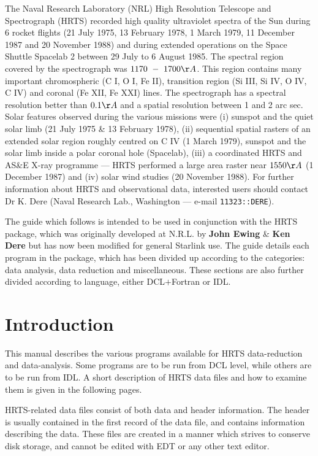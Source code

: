 The Naval Research Laboratory (NRL) High Resolution Telescope and Spectrograph
(HRTS) recorded high quality ultraviolet spectra of the Sun during 6 rocket 
flights (21 July 1975, 13 February 1978, 1 March 1979, 11 December 1987 
and 20 November 1988) and during extended operations on the Space 
Shuttle Spacelab 2 between 29 July to 6 August 1985. The spectral region 
covered by the spectrograph was $1170 \ - \ 1700\AA$. This region 
contains many important chromospheric (C I, O I, Fe II), transition 
region (Si III, Si IV, O IV, C IV) and coronal (Fe XII, Fe XXI) lines. 
The spectrograph has a spectral resolution better than $0.1\AA$ and a 
spatial resolution between 1 and 2 arc sec. Solar features observed 
during the various missions were (i) sunspot and the quiet solar limb 
(21 July 1975 \& 13 February 1978), (ii) sequential spatial rasters of 
an extended solar region roughly centred on C IV (1 March  1979), 
sunspot and the solar limb inside a polar coronal hole (Spacelab), (iii) 
a coordinated HRTS and AS\&E X-ray programme --- HRTS performed a large 
area raster near $1550\AA$ (1 December 1987) and (iv) solar wind studies 
(20 November 1988). For further information about HRTS and observational 
data, interested users should contact Dr K. Dere (Naval Research Lab., 
Washington --- e-mail {\tt 11323::DERE}).

 The guide which follows is intended to be used in conjunction with the 
 HRTS package, which was originally developed at N.R.L. by {\bf John Ewing}
 \& {\bf Ken Dere} but has now been modified for general Starlink use.
 The guide details each program
 in the package, which has been divided up according to the categories:
 data analysis, data reduction and miscellaneous. These sections are also
 further divided according to language, either DCL$+$Fortran or IDL.


\newpage

\section{Introduction}

This manual describes the various programs available for HRTS data-reduction
and data-anal\-ysis.  Some programs are to be run from DCL level, while others
are to be run from IDL. A short description of HRTS data files and how to
examine them is given in the following pages.

HRTS-related data files consist of both data and header information. The header
is usually contained in the first record of the data file, and contains
information describing the data. These files are created in a manner which
strives to conserve disk storage, and cannot be edited with EDT or any other
text editor.

